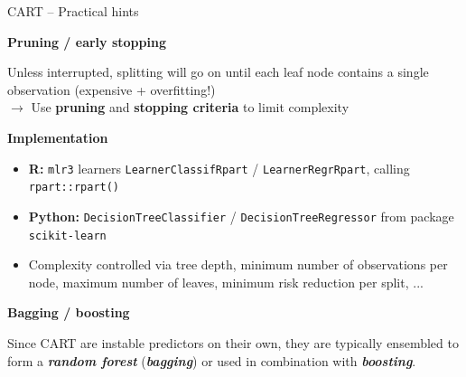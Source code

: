 \documentclass[11pt,compress,t,notes=noshow, xcolor=table]{beamer}
\newcommand{\bfit}[1]{\textbf{\textit{#1}}}
\newcommand{\highlight}[1]{\textcolor{highlightcol}{\textbf{#1}}}
\let\code=\texttt
\begin{document}
\begin{frame}{CART -- Practical hints}

\footnotesize

\highlight{Pruning / early stopping}

Unless interrupted, splitting will go on until each leaf node contains a single 
observation (expensive + overfitting!) \\
\smallskip
$\rightarrow$ Use \textbf{pruning} and \textbf{stopping criteria} to limit 
complexity

\medskip

\highlight{Implementation}
\begin{itemize}
  \item \textbf{R:} \code{mlr3} learners \code{LearnerClassifRpart} / 
    \code{LearnerRegrRpart}, calling \code{rpart::rpart()}
  \item \textbf{Python:} \code{DecisionTreeClassifier} / 
  \code{DecisionTreeRegressor} from package \code{scikit-learn}
  \item Complexity controlled via tree depth, minimum number of observations 
  per node, maximum number of leaves, minimum risk reduction per split, ...
\end{itemize}

\medskip

\highlight{Bagging / boosting} 

Since CART are instable predictors on their own, they are typically ensembled
to form a \bfit{random forest} (\bfit{bagging}) or used in combination with 
\bfit{boosting}.

\end{frame}

\end{document}
